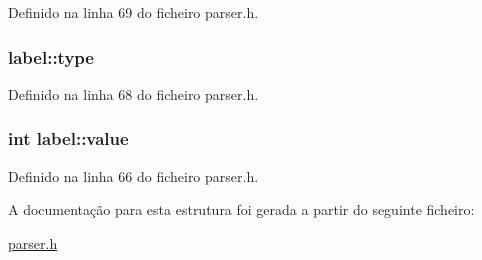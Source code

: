 Definido na linha 69 do ficheiro parser.\-h.

\hypertarget{structlabel_ab48c1902da69d040b3a1e34740e82937}{
\subsubsection[{type}]{ label\-::type}}\label{structlabel_ab48c1902da69d040b3a1e34740e82937}


Definido na linha 68 do ficheiro parser.\-h.

\hypertarget{structlabel_ac0cdaf20932b7fe75988a1d08510b72c}{
\subsubsection[{value}]{\setlength{\rightskip}{0pt plus 5cm}int label\-::value}}\label{structlabel_ac0cdaf20932b7fe75988a1d08510b72c}


Definido na linha 66 do ficheiro parser.\-h.



A documentação para esta estrutura foi gerada a partir do seguinte ficheiro\-:\begin{DoxyCompactItemize}
\item 
\hyperlink{parser_8h}{parser.\-h}\end{DoxyCompactItemize}
